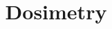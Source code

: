 \documentclass{article}
\title{Dosimetry}
\date{}
\begin{document}
	\maketitle
	\tableofcontents
	
	\begin{abstract}
		
	\end{abstract}
	
	
\end{document}
